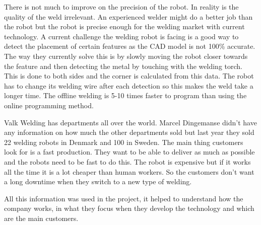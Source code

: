 There is not much to improve on the precision of the robot.
In reality is the quality of the weld irrelevant. 
An experienced welder might do a better job than the robot but the robot is precise enough for the welding market with current technology.
A current challenge the welding robot is facing is a good way to detect the placement of certain features as the CAD model is not 100\% accurate.
The way they currently solve this is by slowly moving the robot closer towards the feature and then detecting the metal by touching with the welding torch. 
This is done to both sides and the corner is calculated from this data.
The robot has to change its welding wire after each detection so this makes the weld take a longer time.
The offline welding is 5-10 times faster to program than using the online programming method. 

Valk Welding has departments all over the world. 
Marcel Dingemanse didn't have any information on how much the other departments sold but last year they sold 22 welding robots in Denmark and 100 in Sweden.
The main thing customers look for is a fast production.
They want to be able to deliver as much as possible and the robots need to be fast to do this.
The robot is expensive but if it works all the time it is a lot cheaper than human workers.
So the customers don't want a long downtime when they switch to a new type of welding.

All this information was used in the project, it helped to understand how the company works, in what they focus when they develop the technology and which are the main customers.
